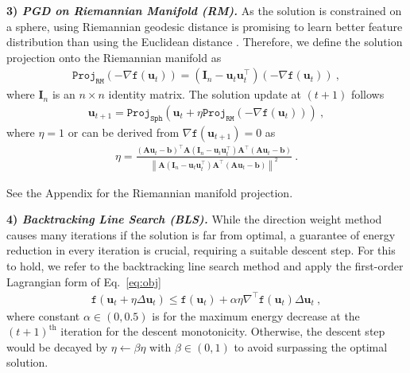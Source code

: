 \documentclass{article}
\newcommand{\mb}[1]{\mathbf{#1}}
\newcommand\norm[1]{\left\lVert#1\right\rVert}
\theoremstyle{plain}
\theoremstyle{definition}
\theoremstyle{remark}
\begin{document}
\textbf{3) \textit{PGD on Riemannian Manifold (RM).}}
%
As the solution is constrained on a sphere, using Riemannian geodesic distance is promising to learn better feature distribution than using the Euclidean distance \citep{rieman-geodesic-brain,rieman-geodesic-domain}.
Therefore, we define the solution projection onto the Riemannian manifold \citep{boumal2020intromanifolds} as
%
\begin{equation}
\begin{aligned}
\label{eq:rie}
\texttt{Proj}_{\texttt{RM}}\left( -\nabla \texttt{f}(\mb{u}_t) \right) = \left( \mb{I}_n - \mb{u}_t \mb{u}^\top_t \right) \left( -\nabla \texttt{f}(\mb{u}_t) \right)\ ,
\end{aligned}
\end{equation}
where $\mb{I}_n$ is an $n \times n$ identity matrix.
The solution update at $(t+1)$ follows
%
\begin{equation}
\begin{aligned}
\label{eq:rie_solution_update}
\mb{u}_{t+1} = \texttt{Proj}_{\texttt{Sph}}\left( \mb{u}_t + \eta \texttt{Proj}_{\texttt{RM}} \left( -\nabla \texttt{f}(\mb{u}_t) \right) \right)\ ,
\end{aligned}
\end{equation}
where $\eta=1$ or can be derived from $\nabla \texttt{f}(\mb{u}_{t+1}) = 0$ as
%
\begin{equation}
\begin{aligned}
\label{eq:rie_eta}
\eta = \frac{\left( \mb{A}\mb{u}_t - \mb{b} \right)^\top \mb{A} \left( \mb{I}_n - \mb{u}_t \mb{u}^\top_t \right) \mb{A}^\top (\mb{A} \mb{u}_t - \mb{b})}{\norm{ \mb{A}(\mb{I}_n - \mb{u}_t \mb{u}^\top_t) \mb{A}^\top (\mb{A} \mb{u}_t - \mb{b}) }^2}\ .
\end{aligned}
\end{equation}

See the Appendix for the Riemannian manifold projection.

\textbf{4) \textit{Backtracking Line Search (BLS).}}
While the direction weight method causes many iterations if the solution is far from optimal, a guarantee of energy reduction in every iteration is crucial, requiring a suitable descent step.
%
For this to hold, we refer to the backtracking line search method \citep{boyd2004convex} and apply the first-order Lagrangian form of Eq.~\eqref{eq:obj}
%
\begin{equation}
\begin{aligned}
\label{eq:backtrack}
\texttt{f}(\mb{u}_t+\eta \Delta \mb{u}_t) \leq \texttt{f}(\mb{u}_t) + \alpha \eta \nabla^\top \texttt{f}(\mb{u}_t) \Delta \mb{u}_t\ ,
\end{aligned}
\end{equation}
where constant $\alpha \in (0, 0.5)$ is for the maximum energy decrease at the $(t+1)^{\text{th}}$ iteration for the descent monotonicity.
Otherwise, the descent step would be decayed by $\eta \leftarrow \beta \eta$ with $\beta \in (0, 1)$ to avoid surpassing the optimal solution.
\end{document}
